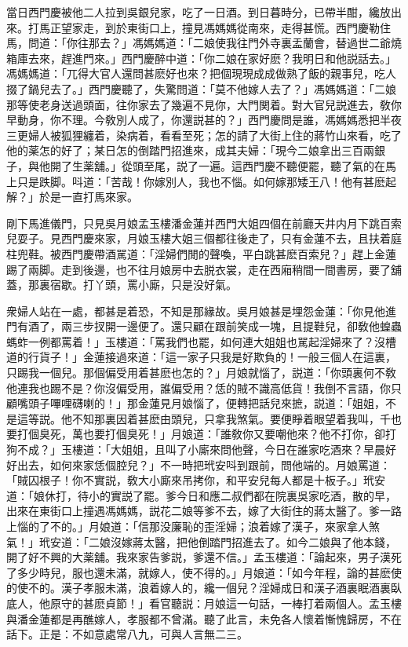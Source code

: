當日西門慶被他二人拉到吳銀兒家，吃了一日酒。到日暮時分，已帶半酣，纔放出來。打馬正望家走，到於東街口上，撞見馮媽媽從南來，走得甚慌。西門慶勒住馬，問道：「你往那去？」馮媽媽道：「二娘使我往門外寺裏盂蘭會，替過世二爺燒箱庫去來，趕進門來。」西門慶醉中道：「你二娘在家好麽？我明日和他説話去。」馮媽媽道：「兀得大官人還問甚麽好也來？把個現現成成做熟了飯的親事兒，吃人掇了鍋兒去了。」西門慶聽了，失驚問道：「莫不他嫁人去了？」馮媽媽道：「二娘那等使老身送過頭面，往你家去了幾遍不見你，大門関着。對大官兒説進去，敎你早動身，你不理。今敎別人成了，你還説甚的？」西門慶問是誰，馮媽媽悉把半夜三更婦人被狐狸纏着，染病着，看看至死；怎的請了大街上住的蔣竹山來看，吃了他的薬怎的好了；某日怎的倒踏門招進來，成其夫婦：「現今二娘拿出三百兩銀子，與他開了生薬舖。」從頭至尾，説了一遍。這西門慶不聽便罷，聽了氣的在馬上只是跌脚。呌道：「苦哉！你嫁別人，我也不惱。如何嫁那矮王八！他有甚麽起解？」於是一直打馬來家。

剛下馬進儀門，只見吳月娘孟玉樓潘金蓮并西門大姐四個在前廳天井内月下跳百索兒耍子。見西門慶來家，月娘玉樓大姐三個都往後走了，只有金蓮不去，且扶着庭柱兜鞋。被西門慶帶酒駡道：「淫婦們閒的聲喚，平白跳甚麽百索兒？」趕上金蓮踢了兩脚。走到後邊，也不往月娘房中去脱衣裳，走在西廂稍間一間書房，要了舖蓋，那裏宿歇。打丫頭，罵小廝，只是没好氣。

衆婦人站在一處，都甚是着恐，不知是那緣故。吳月娘甚是埋怨金蓮：「你見他進門有酒了，兩三步扠開一邊便了。還只顧在跟前笑成一塊，且提鞋兒，卻敎他蝗蟲螞蚱一例都罵着！」玉樓道：「罵我們也罷，如何連大姐姐也駡起淫婦來了？沒槽道的行貨子！」金蓮接過來道：「這一家子只我是好欺負的！一般三個人在這裏，只踢我一個兒。那個偏受用着甚麽也怎的？」月娘就惱了，説道：「你頭裏何不敎他連我也踢不是？你沒偏受用，誰偏受用？恁的賊不識高低貨！我倒不言語，你只顧嘴頭子嗶哩礴喇的！」那金蓮見月娘惱了，便轉把話兒來摭，説道：「姐姐，不是這等説。他不知那裏因着甚麽由頭兒，只拿我煞氣。要便睜着眼望着我叫，千也要打個臭死，萬也要打個臭死！」月娘道：「誰敎你又要嘲他來？他不打你，卻打狗不成？」玉樓道：「大姐姐，且叫了小廝來問他聲，今日在誰家吃酒來？早晨好好出去，如何來家恁個腔兒？」不一時把玳安呌到跟前，問他端的。月娘罵道：「賊囚根子！你不實説，敎大小廝來吊拷你，和平安兒每人都是十板子。」玳安道：「娘休打，待小的實説了罷。爹今日和應二叔們都在院裏吳家吃酒，散的早，出來在東街口上撞遇馮媽媽，説花二娘等爹不去，嫁了大街住的蔣太醫了。爹一路上惱的了不的。」月娘道：「信那没廉恥的歪淫婦；浪着嫁了漢子，來家拿人煞氣！」玳安道：「二娘沒嫁蔣太醫，把他倒踏門招進去了。如今二娘與了他本錢，開了好不興的大薬舖。我來家告爹説，爹還不信。」孟玉樓道：「論起來，男子漢死了多少時兒，服也還未滿，就嫁人，使不得的。」月娘道：「如今年程，論的甚麽使的使不的。漢子孝服未滿，浪着嫁人的，纔一個兒？淫婦成日和漢子酒裏眠酒裏臥底人，他原守的甚麽貞節！」看官聽説：月娘這一句話，一棒打着兩個人。孟玉樓與潘金蓮都是再醮嫁人，孝服都不曾滿。聽了此言，未免各人懷着慚愧歸房，不在話下。正是：不如意處常八九，可與人言無二三。

